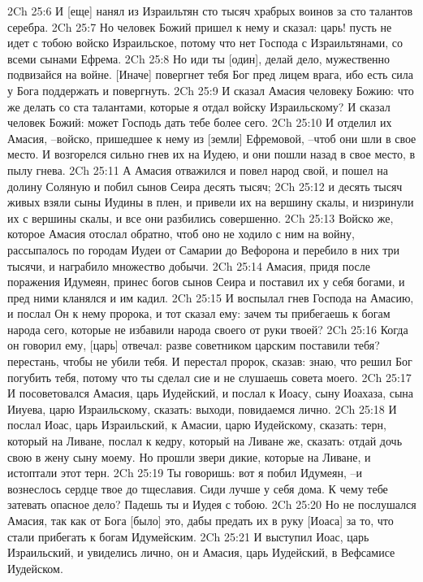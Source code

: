 2Ch 25:6  И [еще] нанял из Израильтян сто тысяч храбрых воинов за сто талантов серебра.
2Ch 25:7  Но человек Божий пришел к нему и сказал: царь! пусть не идет с тобою войско Израильское, потому что нет Господа с Израильтянами, со всеми сынами Ефрема.
2Ch 25:8  Но иди ты [один], делай дело, мужественно подвизайся на войне. [Иначе] повергнет тебя Бог пред лицем врага, ибо есть сила у Бога поддержать и повергнуть.
2Ch 25:9  И сказал Амасия человеку Божию: что же делать со ста талантами, которые я отдал войску Израильскому? И сказал человек Божий: может Господь дать тебе более сего.
2Ch 25:10  И отделил их Амасия, --войско, пришедшее к нему из [земли] Ефремовой, --чтоб они шли в свое место. И возгорелся сильно гнев их на Иудею, и они пошли назад в свое место, в пылу гнева.
2Ch 25:11  А Амасия отважился и повел народ свой, и пошел на долину Соляную и побил сынов Сеира десять тысяч;
2Ch 25:12  и десять тысяч живых взяли сыны Иудины в плен, и привели их на вершину скалы, и низринули их с вершины скалы, и все они разбились совершенно.
2Ch 25:13  Войско же, которое Амасия отослал обратно, чтоб оно не ходило с ним на войну, рассыпалось по городам Иудеи от Самарии до Вефорона и перебило в них три тысячи, и награбило множество добычи.
2Ch 25:14  Амасия, придя после поражения Идумеян, принес богов сынов Сеира и поставил их у себя богами, и пред ними кланялся и им кадил.
2Ch 25:15  И воспылал гнев Господа на Амасию, и послал Он к нему пророка, и тот сказал ему: зачем ты прибегаешь к богам народа сего, которые не избавили народа своего от руки твоей?
2Ch 25:16  Когда он говорил ему, [царь] отвечал: разве советником царским поставили тебя? перестань, чтобы не убили тебя. И перестал пророк, сказав: знаю, что решил Бог погубить тебя, потому что ты сделал сие и не слушаешь совета моего.
2Ch 25:17  И посоветовался Амасия, царь Иудейский, и послал к Иоасу, сыну Иоахаза, сына Ииуева, царю Израильскому, сказать: выходи, повидаемся лично.
2Ch 25:18  И послал Иоас, царь Израильский, к Амасии, царю Иудейскому, сказать: терн, который на Ливане, послал к кедру, который на Ливане же, сказать: отдай дочь свою в жену сыну моему. Но прошли звери дикие, которые на Ливане, и истоптали этот терн.
2Ch 25:19  Ты говоришь: вот я побил Идумеян, --и вознеслось сердце твое до тщеславия. Сиди лучше у себя дома. К чему тебе затевать опасное дело? Падешь ты и Иудея с тобою.
2Ch 25:20  Но не послушался Амасия, так как от Бога [было] это, дабы предать их в руку [Иоаса] за то, что стали прибегать к богам Идумейским.
2Ch 25:21  И выступил Иоас, царь Израильский, и увиделись лично, он и Амасия, царь Иудейский, в Вефсамисе Иудейском.
